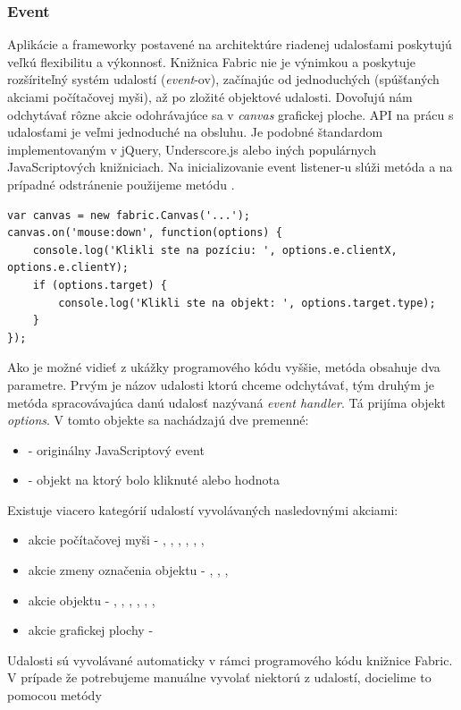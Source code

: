 \subsubsection{Event}

Aplikácie a frameworky postavené na architektúre riadenej udalosťami poskytujú veľkú flexibilitu a výkonnosť. Knižnica Fabric nie je výnimkou a poskytuje rozšíriteľný systém udalostí (\textit{event}-ov), začínajúc od jednoduchých (spúšťaných akciami počítačovej myši), až po zložité objektové udalosti. Dovoľujú nám odchytávať rôzne akcie odohrávajúce sa v \textit{canvas} grafickej ploche. API na prácu s udalosťami je veľmi jednoduché na obsluhu. Je podobné štandardom implementovaným v jQuery, Underscore.js alebo iných populárnych JavaScriptových knižniciach. Na inicializovanie event listener-u slúži metóda  a na prípadné odstránenie použijeme metódu .
\begin{lstlisting}[style=web,caption={Ukážka programovej implementácie na prácu s eventami},captionpos=b, label={lst:fabric-events}]
var canvas = new fabric.Canvas('...');
canvas.on('mouse:down', function(options) {
	console.log('Klikli ste na pozíciu: ', options.e.clientX, options.e.clientY);
	if (options.target) {
		console.log('Klikli ste na objekt: ', options.target.type);
	}
});
\end{lstlisting}
Ako je možné vidieť z ukážky programového kódu vyššie, metóda  obsahuje dva parametre. Prvým je názov udalosti ktorú chceme odchytávať, tým druhým je metóda spracovávajúca danú udalosť nazývaná \textit{event handler}. Tá prijíma objekt \textit{options}. V tomto objekte sa nachádzajú dve premenné:
\begin{itemize}
	\item {} - originálny JavaScriptový event
	\item {} - objekt na ktorý bolo kliknuté alebo hodnota 
\end{itemize}
Existuje viacero kategórií udalostí vyvolávaných nasledovnými akciami:
\begin{itemize}
	\item akcie počítačovej myši - , , , , , , 
	\item akcie zmeny označenia objektu - , , , 
	\item akcie objektu - , , , , , , 
	\item akcie grafickej plochy - 
\end{itemize}
Udalosti sú vyvolávané automaticky v rámci programového kódu knižnice Fabric. V prípade že potrebujeme manuálne vyvolať niektorú z udalostí, docielime to pomocou metódy  

